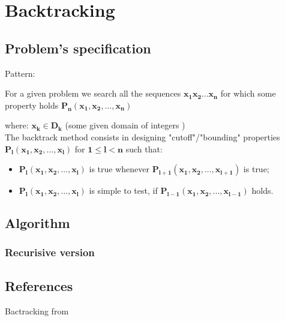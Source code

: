 \chapter{Backtracking}
\section{Problem's specification}

Pattern:

For a given problem we search all the sequences  $\bm{x_{1}x_{2} ... x_{n}}$ for which some property holds
 $\bm{P_n(x_{1},x_{2}, ..., x_{n})}$

\bigskip where: $\bm{x_k \in D_k}$ (some given domain of integers )
\\
The backtrack method consists in designing "cutoff"/"bounding" properties $\bm{P_l(x_{1},x_{2}, ..., x_{l})}$ for $\bm{1\leq l < n}$ such that: 

\begin{itemize}
 \item $\bm{P_l(x_{1},x_{2}, ..., x_{l})}$ is true whenever $\bm{P_{l+1}(x_{1},x_{2}, ..., x_{l+1})}$ is true;
 \item $\bm{P_l(x_{1},x_{2}, ..., x_{l})}$ is simple to test, if $\bm{P_{l-1}(x_{1},x_{2}, ..., x_{l-1})}$ holds.
 
\end{itemize}

\section{Algorithm}
\subsection{Recurisive version}
%
\SetAlgoLongEnd
\begin{algorithm}
\end{algorithm}


\section{References}

Bactracking from \cite{KnuthArtOfCompProg4-5b}